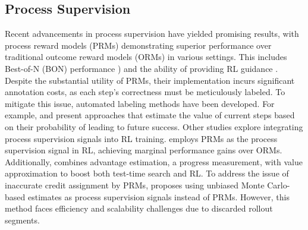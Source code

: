 {\subsection{Process Supervision}
Recent advancements in process supervision have yielded promising results, with process reward models (PRMs) demonstrating superior performance over traditional outcome reward models (ORMs) in various settings. This includes Best-of-N (BON) performance \citep{lightman2023letsverifystepstep, wang2024mathshepherdverifyreinforcellms}) and the ability of providing RL guidance \citep{wang2024mathshepherdverifyreinforcellms}. Despite the substantial utility of PRMs, their implementation incurs significant annotation costs, as each step's correctness must be meticulously labeled. To mitigate this issue, automated labeling methods have been developed. For example, \citep{luo2024improvemathematicalreasoninglanguage} and \citep{wang2024mathshepherdverifyreinforcellms} present approaches that estimate the value of current steps based on their probability of leading to future success. Other studies explore integrating process supervision signals into RL training. \citep{shao2024deepseekmathpushinglimitsmathematical} employs PRMs as the process supervision signal in RL, achieving marginal performance gains over ORMs. Additionally, \citep{setlur2024rewardingprogressscalingautomated} combines advantage estimation, a progress measurement, with value approximation to boost both test-time search and RL. To address the issue of inaccurate credit assignment by PRMs, \citep{kazemnejad2024vineppounlockingrlpotential} proposes using unbiased Monte Carlo-based estimates as process supervision signals instead of PRMs. However, this method faces efficiency and scalability challenges due to discarded rollout segments.
}









